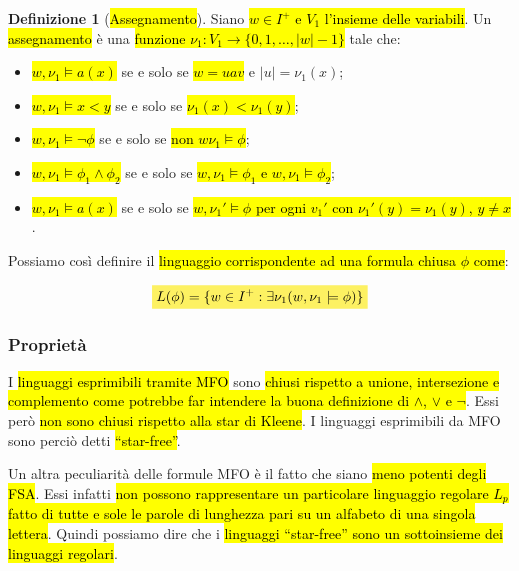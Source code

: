 \documentclass[a4paper,11pt,twoside]{article}
\theoremstyle{plain}
\theoremstyle{definition}
\newtheorem{defn}{Definizione}[section]
\theoremstyle{remark}
\newcommand{\mhl}[1]{\colorbox{hlcolor}{$\displaystyle #1$}}
\begin{document}
\begin{defn}[\hl{Assegnamento}]\label{def:mfo-assegnamento}
  Siano \hl{$w\in I^+$ e $V_1$ l'insieme delle variabili}. Un \hl{assegnamento}
  è una \hl{funzione $\nu_1 : V_1 \to \{0,1,\ldots,|w|-1\}$} tale che:

  \begin{itemize}
    \item \hl{$w,\nu_1 \models a(x)$} se e solo se \hl{$w = uav$} e
      $|u| = \nu_1(x)$;
    \item \hl{$w,\nu_1 \models x < y$} se e solo se \hl{$\nu_1(x) < \nu_1(y)$};
    \item \hl{$w,\nu_1 \models \neg\phi$} se e solo se \hl{non
      $w\nu_1 \models \phi$};
    \item \hl{$w,\nu_1 \models \phi_1 \land \phi_2$} se e solo se
      \hl{$w,\nu_1 \models \phi_1$ e $w,\nu_1 \models \phi_2$};
    \item \hl{$w,\nu_1 \models a(x)$} se e solo se \hl{$w,\nu_1' \models \phi$
      per ogni $v_1'$ con $\nu_1'(y) = \nu_1(y)$, $y \neq x$}.
  \end{itemize}
\end{defn}

Possiamo così definire il \hl{linguaggio corrispondente ad una formula chiusa
$\phi$ come}:

\begin{equation}
  \mhl{ L(\phi) = \{w\in I^+ : \exists\nu_1 (w, \nu_1 \models \phi)\} }
\end{equation}

\subsubsection{Proprietà}\label{sec:mfo-proprietà}

I \hl{linguaggi esprimibili tramite MFO} sono \hl{chiusi rispetto a unione,
intersezione e complemento come potrebbe far intendere la buona definizione di
$\land$, $\lor$ e $\neg$}. Essi però \hl{non sono chiusi rispetto alla star di
Kleene}. I linguaggi esprimibili da MFO sono perciò detti \hl{``star-free''}.

Un altra peculiarità delle formule MFO è il fatto che siano \hl{meno potenti
degli FSA\@}. Essi infatti \hl{non possono rappresentare un particolare
linguaggio regolare $L_p$ fatto di tutte e sole le parole di lunghezza pari su
un alfabeto di una singola lettera}. Quindi possiamo dire che i \hl{linguaggi
``star-free'' sono un sottoinsieme dei linguaggi regolari}.
\end{document}
